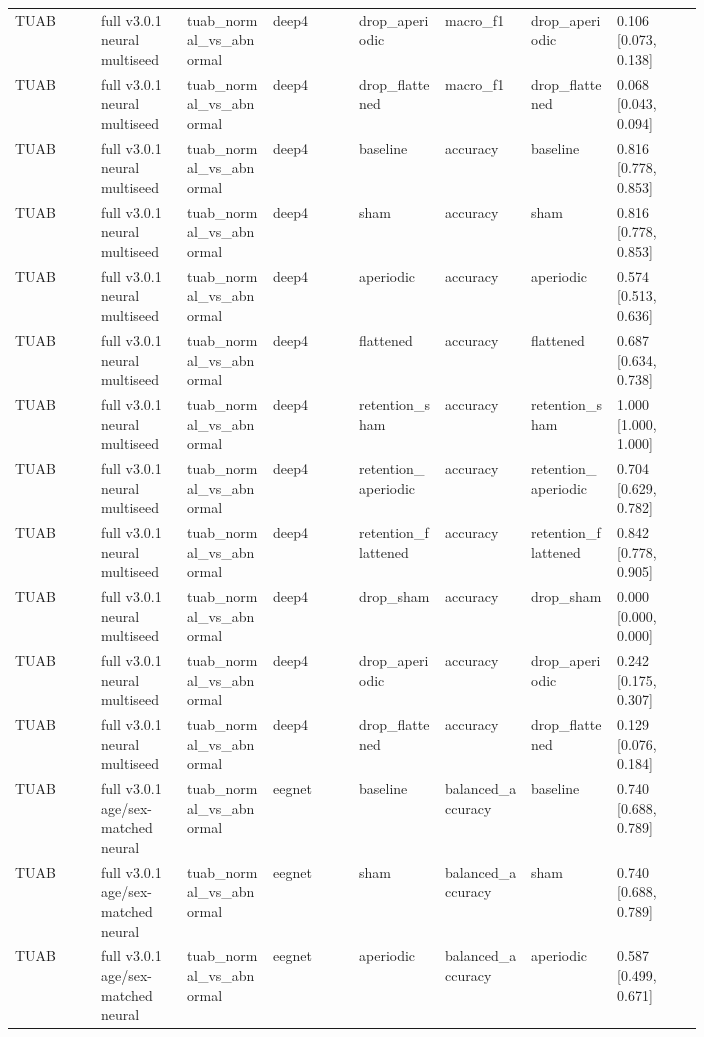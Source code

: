 \begin{longtable}{p{0.10\linewidth}p{0.10\linewidth}p{0.10\linewidth}p{0.10\linewidth}p{0.10\linewidth}p{0.10\linewidth}p{0.10\linewidth}p{0.10\linewidth}}
TUAB & full v3.0.1 neural multiseed & tuab\_normal\_vs\_abnormal & deep4 & drop\_aperiodic & macro\_f1 & drop\_aperiodic & 0.106 [0.073, 0.138]\\
TUAB & full v3.0.1 neural multiseed & tuab\_normal\_vs\_abnormal & deep4 & drop\_flattened & macro\_f1 & drop\_flattened & 0.068 [0.043, 0.094]\\
TUAB & full v3.0.1 neural multiseed & tuab\_normal\_vs\_abnormal & deep4 & baseline & accuracy & baseline & 0.816 [0.778, 0.853]\\
TUAB & full v3.0.1 neural multiseed & tuab\_normal\_vs\_abnormal & deep4 & sham & accuracy & sham & 0.816 [0.778, 0.853]\\
TUAB & full v3.0.1 neural multiseed & tuab\_normal\_vs\_abnormal & deep4 & aperiodic & accuracy & aperiodic & 0.574 [0.513, 0.636]\\
TUAB & full v3.0.1 neural multiseed & tuab\_normal\_vs\_abnormal & deep4 & flattened & accuracy & flattened & 0.687 [0.634, 0.738]\\
TUAB & full v3.0.1 neural multiseed & tuab\_normal\_vs\_abnormal & deep4 & retention\_sham & accuracy & retention\_sham & 1.000 [1.000, 1.000]\\
TUAB & full v3.0.1 neural multiseed & tuab\_normal\_vs\_abnormal & deep4 & retention\_aperiodic & accuracy & retention\_aperiodic & 0.704 [0.629, 0.782]\\
TUAB & full v3.0.1 neural multiseed & tuab\_normal\_vs\_abnormal & deep4 & retention\_flattened & accuracy & retention\_flattened & 0.842 [0.778, 0.905]\\
TUAB & full v3.0.1 neural multiseed & tuab\_normal\_vs\_abnormal & deep4 & drop\_sham & accuracy & drop\_sham & 0.000 [0.000, 0.000]\\
TUAB & full v3.0.1 neural multiseed & tuab\_normal\_vs\_abnormal & deep4 & drop\_aperiodic & accuracy & drop\_aperiodic & 0.242 [0.175, 0.307]\\
TUAB & full v3.0.1 neural multiseed & tuab\_normal\_vs\_abnormal & deep4 & drop\_flattened & accuracy & drop\_flattened & 0.129 [0.076, 0.184]\\
TUAB & full v3.0.1 age/sex-matched neural & tuab\_normal\_vs\_abnormal & eegnet & baseline & balanced\_accuracy & baseline & 0.740 [0.688, 0.789]\\
TUAB & full v3.0.1 age/sex-matched neural & tuab\_normal\_vs\_abnormal & eegnet & sham & balanced\_accuracy & sham & 0.740 [0.688, 0.789]\\
TUAB & full v3.0.1 age/sex-matched neural & tuab\_normal\_vs\_abnormal & eegnet & aperiodic & balanced\_accuracy & aperiodic & 0.587 [0.499, 0.671]\\

\end{longtable}
